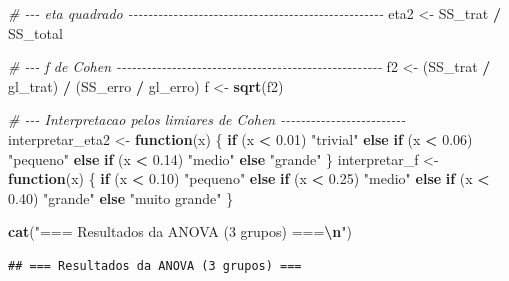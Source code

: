 \documentclass[
]{article}
\newenvironment{Shaded}{\begin{snugshade}}{\end{snugshade}}
\newcommand{\CommentTok}[1]{\textcolor[rgb]{0.56,0.35,0.01}{\textit{#1}}}
\newcommand{\ControlFlowTok}[1]{\textcolor[rgb]{0.13,0.29,0.53}{\textbf{#1}}}
\newcommand{\FloatTok}[1]{\textcolor[rgb]{0.00,0.00,0.81}{#1}}
\newcommand{\FunctionTok}[1]{\textcolor[rgb]{0.13,0.29,0.53}{\textbf{#1}}}
\newcommand{\NormalTok}[1]{#1}
\newcommand{\OtherTok}[1]{\textcolor[rgb]{0.56,0.35,0.01}{#1}}
\newcommand{\SpecialCharTok}[1]{\textcolor[rgb]{0.81,0.36,0.00}{\textbf{#1}}}
\newcommand{\StringTok}[1]{\textcolor[rgb]{0.31,0.60,0.02}{#1}}
\begin{document}
\begin{Shaded}
\begin{Highlighting}[]
\CommentTok{\# {-}{-}{-} eta quadrado {-}{-}{-}{-}{-}{-}{-}{-}{-}{-}{-}{-}{-}{-}{-}{-}{-}{-}{-}{-}{-}{-}{-}{-}{-}{-}{-}{-}{-}{-}{-}{-}{-}{-}{-}{-}{-}{-}{-}{-}{-}{-}{-}{-}{-}{-}{-}{-}{-}{-}{-}}
\NormalTok{eta2 }\OtherTok{\textless{}{-}}\NormalTok{ SS\_trat }\SpecialCharTok{/}\NormalTok{ SS\_total}

\CommentTok{\# {-}{-}{-} f de Cohen {-}{-}{-}{-}{-}{-}{-}{-}{-}{-}{-}{-}{-}{-}{-}{-}{-}{-}{-}{-}{-}{-}{-}{-}{-}{-}{-}{-}{-}{-}{-}{-}{-}{-}{-}{-}{-}{-}{-}{-}{-}{-}{-}{-}{-}{-}{-}{-}{-}{-}{-}{-}{-}}
\NormalTok{f2 }\OtherTok{\textless{}{-}}\NormalTok{ (SS\_trat }\SpecialCharTok{/}\NormalTok{ gl\_trat) }\SpecialCharTok{/}\NormalTok{ (SS\_erro }\SpecialCharTok{/}\NormalTok{ gl\_erro)}
\NormalTok{f  }\OtherTok{\textless{}{-}} \FunctionTok{sqrt}\NormalTok{(f2)}

\CommentTok{\# {-}{-}{-} Interpretacao pelos limiares de Cohen {-}{-}{-}{-}{-}{-}{-}{-}{-}{-}{-}{-}{-}{-}{-}{-}{-}{-}{-}{-}{-}{-}{-}{-}{-}}
\NormalTok{interpretar\_eta2 }\OtherTok{\textless{}{-}} \ControlFlowTok{function}\NormalTok{(x) \{}
  \ControlFlowTok{if}\NormalTok{ (x }\SpecialCharTok{\textless{}} \FloatTok{0.01}\NormalTok{) }\StringTok{"trivial"}
  \ControlFlowTok{else} \ControlFlowTok{if}\NormalTok{ (x }\SpecialCharTok{\textless{}} \FloatTok{0.06}\NormalTok{) }\StringTok{"pequeno"}
  \ControlFlowTok{else} \ControlFlowTok{if}\NormalTok{ (x }\SpecialCharTok{\textless{}} \FloatTok{0.14}\NormalTok{) }\StringTok{"medio"}
  \ControlFlowTok{else} \StringTok{"grande"}
\NormalTok{\}}
\NormalTok{interpretar\_f }\OtherTok{\textless{}{-}} \ControlFlowTok{function}\NormalTok{(x) \{}
  \ControlFlowTok{if}\NormalTok{ (x }\SpecialCharTok{\textless{}} \FloatTok{0.10}\NormalTok{) }\StringTok{"pequeno"}
  \ControlFlowTok{else} \ControlFlowTok{if}\NormalTok{ (x }\SpecialCharTok{\textless{}} \FloatTok{0.25}\NormalTok{) }\StringTok{"medio"}
  \ControlFlowTok{else} \ControlFlowTok{if}\NormalTok{ (x }\SpecialCharTok{\textless{}} \FloatTok{0.40}\NormalTok{) }\StringTok{"grande"}
  \ControlFlowTok{else} \StringTok{"muito grande"}
\NormalTok{\}}

\FunctionTok{cat}\NormalTok{(}\StringTok{"=== Resultados da ANOVA (3 grupos) ===}\SpecialCharTok{\textbackslash{}n}\StringTok{"}\NormalTok{)}
\end{Highlighting}
\end{Shaded}

\begin{verbatim}
## === Resultados da ANOVA (3 grupos) ===
\end{verbatim}
\end{document}
